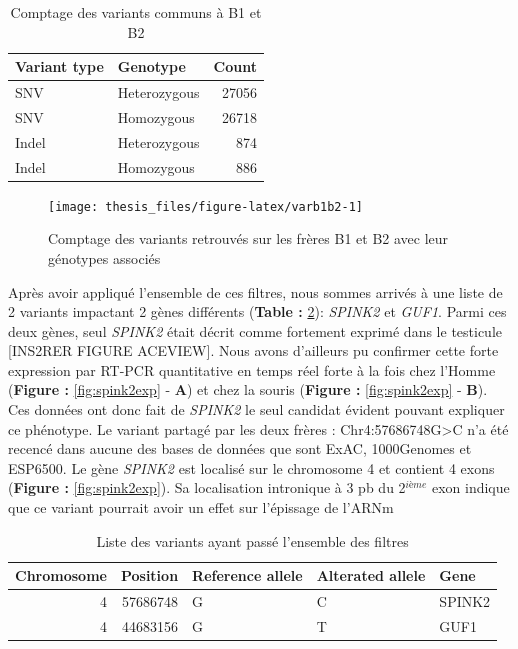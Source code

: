 \documentclass[12pt,twoside]{reedthesis}
\theoremstyle{definition}
\theoremstyle{definition}
\theoremstyle{remark}
\begin{document}
  \begin{table}
  
  \caption{\label{tab:tabcommonvar}Comptage des variants communs à B1 et B2}
  \centering
  \begin{tabular}[t]{l|l|r}
  \hline
  Variant type & Genotype & Count\\
  \hline
  SNV & Heterozygous & 27056\\
  \hline
  SNV & Homozygous & 26718\\
  \hline
  Indel & Heterozygous & 874\\
  \hline
  Indel & Homozygous & 886\\
  \hline
  \end{tabular}
  \end{table}
  
  \begin{figure}
  
  {\centering \texttt{[image: thesis\_files/figure-latex/varb1b2-1]} 
  
  }
  
  \caption[Comptage des variants retrouvés sur les frères B1 et B2 avec leur génotypes associés]{Comptage des variants retrouvés sur les frères B1 et B2 avec leur génotypes associés}\label{fig:varb1b2}
  \end{figure}
  
  Après avoir appliqué l'ensemble de ces filtres, nous sommes arrivés à
  une liste de 2 variants impactant 2 gènes différents (\textbf{Table :
  }\ref{tab:passingfiltervar}): \emph{SPINK2} et \emph{GUF1}. Parmi ces
  deux gènes, seul \emph{SPINK2} était décrit comme fortement exprimé dans
  le testicule {[}INS2RER FIGURE ACEVIEW{]}. Nous avons d'ailleurs pu
  confirmer cette forte expression par RT-PCR quantitative en temps réel
  forte à la fois chez l'Homme (\textbf{Figure : }\ref{fig:spink2exp} -
  \textbf{A}) et chez la souris (\textbf{Figure : }\ref{fig:spink2exp} -
  \textbf{B}). Ces données ont donc fait de \emph{SPINK2} le seul candidat
  évident pouvant expliquer ce phénotype. Le variant partagé par les deux
  frères : Chr4:57686748G\textgreater{}C n'a été recencé dans aucune des
  bases de données que sont ExAC, 1000Genomes et ESP6500. Le gène
  \emph{SPINK2} est localisé sur le chromosome 4 et contient 4 exons
  (\textbf{Figure : }\ref{fig:spink2exp}). Sa localisation intronique à 3
  pb du 2\(^{ième}\) exon indique que ce variant pourrait avoir un effet
  sur l'épissage de l'ARNm
  
  \begin{table}
  
  \caption{\label{tab:passingfiltervar}Liste des variants ayant passé l'ensemble des filtres}
  \centering
  \begin{tabular}[t]{r|r|l|l|l}
  \hline
  Chromosome & Position & Reference allele & Alterated allele & Gene\\
  \hline
  4 & 57686748 & G & C & SPINK2\\
  \hline
  4 & 44683156 & G & T & GUF1\\
  \hline
  \end{tabular}
  \end{table}
  
\end{document}
